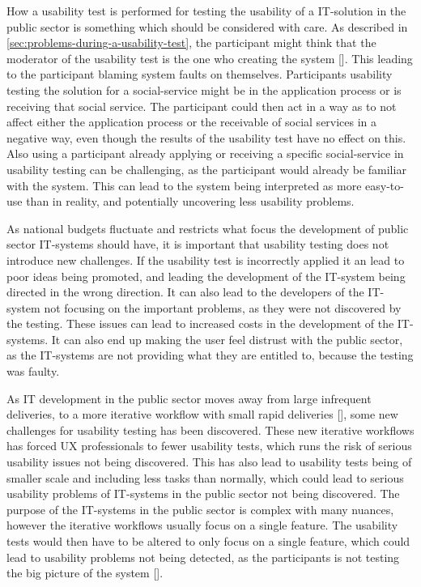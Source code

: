 How a usability test is performed for testing the usability of a IT-solution in the public sector is something which should be considered with care. As described in \autoref{sec:problems-during-a-usability-test}, the participant might think that the moderator of the usability test is the one who creating the system [\cite{dn_2016}]. This leading to the participant blaming system faults on themselves. Participants usability testing the solution for a social-service might be in the application process or is receiving that social service. The participant could then act in a way as to not affect either the application process or the receivable of social services in a negative way, even though the results of the usability test have no effect on this. Also using a participant already applying or receiving a specific social-service in usability testing can be challenging, as the participant would already be familiar with the system. This can lead to the system being interpreted as more easy-to-use than in reality, and potentially uncovering less usability problems.

As national budgets fluctuate and restricts what focus the development of public sector IT-systems should have, it is important that usability testing does not introduce new challenges. If the usability test is incorrectly applied it an lead to poor ideas being promoted, and leading the development of the IT-system being directed in the wrong direction. It can also lead to the developers of the IT-system not focusing on the important problems, as they were not discovered by the testing. These issues can lead to increased costs in the development of the IT-systems. It can also end up making the user feel distrust with the public sector, as the IT-systems are not providing what they are entitled to, because the testing was faulty.  

As IT development in the public sector moves away from large infrequent deliveries, to a more iterative workflow with small rapid deliveries [\cite{at_2021}], some new challenges for usability testing has been discovered. These new iterative workflows has forced UX professionals to fewer usability tests, which runs the risk of serious usability issues not being discovered. This has also lead to usability tests being of smaller scale and including less tasks than normally, which could lead to serious usability problems of IT-systems in the public sector not being discovered. The purpose of the IT-systems in the public sector is complex with many nuances, however the iterative workflows usually focus on a single feature. The usability tests would then have to be altered to only focus on a single feature, which could lead to usability problems not being detected, as the participants is not testing the big picture of the system [\cite{ln_2012}].

